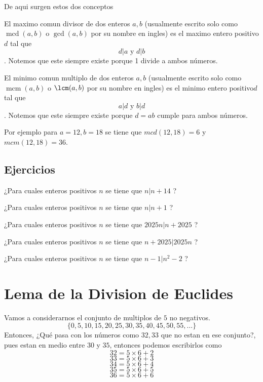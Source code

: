 \documentclass[11pt]{scrartcl}
\newcommand{\mcd}{\operatorname{mcd}}
\newcommand{\mcm}{\operatorname{mcm}}
\begin{document}
De aqui surgen estos dos conceptos
\begin{definition}
El maximo comun divisor de dos enteros $a,b$ (usualmente escrito solo como $\mcd(a,b)$ o $\gcd(a,b)$ por su nombre en ingles) es el maximo entero positivo $d$ tal que 
\[  d | a \text{ y } d | b   \].
Notemos que este siempre existe porque 1 divide a ambos números. 
\end{definition}
\begin{definition}
El minimo comun multiplo de dos enteros $a,b$ (usualmente escrito solo como $\mcm(a,b)$ o $\lcm(a,b)$ por su nombre en ingles) es el minimo entero positivo$d$ tal que 
\[  a| d  \text{ y } b | d   \].
Notemos que este siempre existe porque  $d=ab$ cumple para ambos números. 
\end{definition}
Por ejemplo para $a=12, b=18$ se tiene que $mcd (12,18)=6$ y $mcm(12,18)=36$. \\


\subsection{Ejercicios}
\begin{exercise} ¿Para cuales enteros positivos $n$ se tiene que $n | n+14$ ? \end{exercise}
\begin{exercise} ¿Para cuales enteros positivos $n$ se tiene que $n | n+1$ ? \end{exercise}
\begin{exercise} ¿Para cuales enteros positivos $n$ se tiene que $2025n | n +2025 $ ? \end{exercise} 
\begin{exercise} ¿Para cuales enteros positivos $n$ se tiene que $n+2025 | 2025n$ ? \end{exercise}
\begin{exercise} ¿Para cuales enteros positivos $n$ se tiene que $n-1 | n^2-2 $ ? \end{exercise}


\section{Lema de la Division de Euclides}
Vamos a considerarnos el conjunto de multiplos de $5$ no negativos.
\[\{ 0,5,10,15,20,25,30,35,40,45,50,55, \ldots \}\]
Entonces, ¿Qu\'e pasa con los n\'umeros como $32, 33$ que no estan en ese conjunto?, pues estan en medio entre $30$ y $35$, entonces podemos escribirlos como
\[32 = 5 \times 6 + 2\]
\[33 = 5 \times 6 + 3\]
\[34 = 5 \times 6 + 4\]
\[35 = 5 \times 6 + 5\]
\[36 = 5 \times 6 + 6\]
\end{document}
